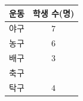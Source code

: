 {\renewcommand{\arraystretch}{1.3}\small
\begin{tabular}{|c|c|}
\hline
운동 & 학생 수(명) \\ \hline
야구 & $7$ \\ \hline
농구 & $6$ \\ \hline
배구 & $3$ \\ \hline
축구 & \\ \hline
탁구 & $4$ \\ \hline
\end{tabular}}
